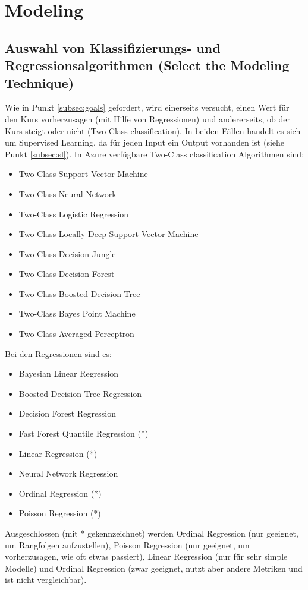 


\section{Modeling}\label{sec:p4}
\subsection{Auswahl von Klassifizierungs- und Regressionsalgorithmen (Select the Modeling Technique)}
Wie in Punkt \ref{subsec:goals} gefordert, wird einerseits versucht, einen Wert für den Kurs vorherzusagen (mit Hilfe von Regressionen) und andererseits, ob der Kurs steigt oder nicht (Two-Class classification). In beiden Fällen handelt es sich um Supervised Learning, da für jeden Input ein Output vorhanden ist (siehe Punkt \ref{subsec:sl}).
In Azure verfügbare Two-Class classification Algorithmen sind:
\begin{itemize}
\item Two-Class Support Vector Machine
\item Two-Class Neural Network
\item Two-Class Logistic Regression
\item Two-Class Locally-Deep Support Vector Machine
\item Two-Class Decision Jungle
\item Two-Class Decision Forest
\item Two-Class Boosted Decision Tree
\item Two-Class Bayes Point Machine
\item Two-Class Averaged Perceptron
\end{itemize}
Bei den Regressionen sind es:
\begin{itemize}
\item Bayesian Linear Regression
\item Boosted Decision Tree Regression
\item Decision Forest Regression
\item Fast Forest Quantile Regression (*)
\item Linear Regression (*)
\item Neural Network Regression
\item Ordinal Regression (*)
\item Poisson Regression (*)
\end{itemize}
Ausgeschlossen (mit * gekennzeichnet) werden Ordinal Regression (nur geeignet, um Rangfolgen aufzustellen), Poisson Regression (nur geeignet, um vorherzusagen, wie oft etwas passiert), Linear Regression (nur für sehr simple Modelle) und Ordinal Regression (zwar geeignet, nutzt aber andere Metriken und ist nicht vergleichbar).
